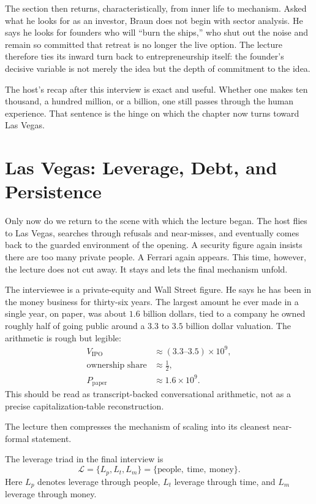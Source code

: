 The section then returns, characteristically, from inner life to mechanism. Asked what he looks for as an investor, Braun does not begin with sector analysis. He says he looks for founders who will ``burn the ships,'' who shut out the noise and remain so committed that retreat is no longer the live option. The lecture therefore ties its inward turn back to entrepreneurship itself: the founder's decisive variable is not merely the idea but the depth of commitment to the idea.

The host's recap after this interview is exact and useful. Whether one makes ten thousand, a hundred million, or a billion, one still passes through the human experience. That sentence is the hinge on which the chapter now turns toward Las Vegas.

\section{Las Vegas: Leverage, Debt, and Persistence}

Only now do we return to the scene with which the lecture began. The host flies to Las Vegas, searches through refusals and near-misses, and eventually comes back to the guarded environment of the opening. A security figure again insists there are too many private people. A Ferrari again appears. This time, however, the lecture does not cut away. It stays and lets the final mechanism unfold.

The interviewee is a private-equity and Wall Street figure. He says he has been in the money business for thirty-six years. The largest amount he ever made in a single year, on paper, was about \(1.6\) billion dollars, tied to a company he owned roughly half of going public around a \(3.3\) to \(3.5\) billion dollar valuation. The arithmetic is rough but legible:
\begin{align}
V_{\text{IPO}} &\approx (3.3\text{--}3.5)\times 10^{9},\\
\text{ownership share} &\approx \frac{1}{2},\\
P_{\text{paper}} &\approx 1.6\times 10^{9}.
\end{align}
This should be read as transcript-backed conversational arithmetic, not as a precise capitalization-table reconstruction.

The lecture then compresses the mechanism of scaling into its cleanest near-formal statement.

\begin{definition}
The leverage triad in the final interview is
\begin{equation}
\mathcal{L}=\{L_p,L_t,L_m\}
=\{\text{people},\ \text{time},\ \text{money}\}.
\end{equation}
Here \(L_p\) denotes leverage through people, \(L_t\) leverage through time, and \(L_m\) leverage through money.
\end{definition}

